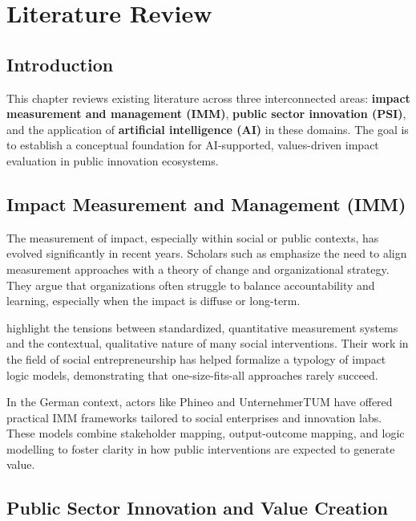 \chapter{Literature Review}\label{ch:literature-review}


\section{Introduction}\label{sec:introduction}

This chapter reviews existing literature across three interconnected areas: \textbf{impact measurement and management (IMM)}, \textbf{public sector innovation (PSI)}, and the application of \textbf{artificial intelligence (AI)} in these domains.
The goal is to establish a conceptual foundation for AI-supported, values-driven impact evaluation in public innovation ecosystems.

\section{Impact Measurement and Management (IMM)}\label{sec:impact-measurement-and-management-(imm)}

The measurement of impact, especially within social or public contexts, has evolved significantly in recent years.
Scholars such as \textcite{ebrahim2014measuring} emphasize the need to align measurement approaches with a theory of change and organizational strategy.
They argue that organizations often struggle to balance accountability and learning, especially when the impact is diffuse or long-term.

\textcite{nicholls2012measuring} highlight the tensions between standardized, quantitative measurement systems and the contextual, qualitative nature of many social interventions.
Their work in the field of social entrepreneurship has helped formalize a typology of impact logic models, demonstrating that one-size-fits-all approaches rarely succeed.

In the German context, actors like Phineo and UnternehmerTUM have offered practical IMM frameworks tailored to social enterprises and innovation labs.
These models combine stakeholder mapping, output-outcome mapping, and logic modelling to foster clarity in how public interventions are expected to generate value.

\section{Public Sector Innovation and Value Creation}\label{sec:public-sector-innovation-and-value-creation}

